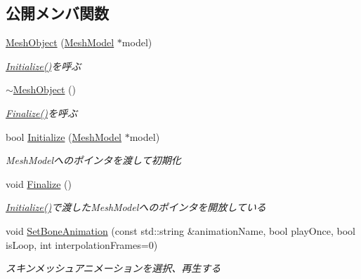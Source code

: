 \subsection*{公開メンバ関数}
\begin{DoxyCompactItemize}
\item 
\mbox{\hyperlink{class_k___graphics_1_1_mesh_object_af59273310f07f67f766f9e90323ce641}{Mesh\+Object}} (\mbox{\hyperlink{class_k___graphics_1_1_mesh_model}{Mesh\+Model}} $\ast$model)
\begin{DoxyCompactList}\small\item\em \mbox{\hyperlink{class_k___graphics_1_1_mesh_object_a248233630419973244851f5d2070b5aa}{Initialize()}}を呼ぶ \end{DoxyCompactList}\item 
\mbox{\hyperlink{class_k___graphics_1_1_mesh_object_ae8c3f648521b8c14da19fa53fe1656f3}{$\sim$\+Mesh\+Object}} ()
\begin{DoxyCompactList}\small\item\em \mbox{\hyperlink{class_k___graphics_1_1_mesh_object_a2d7f1695e98aeba276e2f61b0bca00ab}{Finalize()}}を呼ぶ \end{DoxyCompactList}\item 
bool \mbox{\hyperlink{class_k___graphics_1_1_mesh_object_a248233630419973244851f5d2070b5aa}{Initialize}} (\mbox{\hyperlink{class_k___graphics_1_1_mesh_model}{Mesh\+Model}} $\ast$model)
\begin{DoxyCompactList}\small\item\em Mesh\+Modelへのポインタを渡して初期化 \end{DoxyCompactList}\item 
void \mbox{\hyperlink{class_k___graphics_1_1_mesh_object_a2d7f1695e98aeba276e2f61b0bca00ab}{Finalize}} ()
\begin{DoxyCompactList}\small\item\em \mbox{\hyperlink{class_k___graphics_1_1_mesh_object_a248233630419973244851f5d2070b5aa}{Initialize()}}で渡した\+Mesh\+Modelへのポインタを開放している \end{DoxyCompactList}\item 
void \mbox{\hyperlink{class_k___graphics_1_1_mesh_object_a53fca52d8b8b1abb8d91f666f97bb9ea}{Set\+Bone\+Animation}} (const std\+::string \&animation\+Name, bool play\+Once, bool is\+Loop, int interpolation\+Frames=0)
\begin{DoxyCompactList}\small\item\em スキンメッシュアニメーションを選択、再生する \end{DoxyCompactList}\item 

\end{DoxyCompactItemize}
